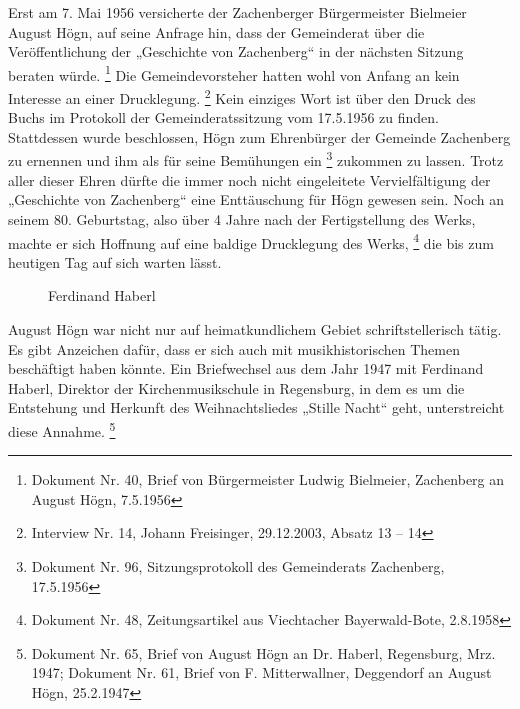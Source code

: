 Erst am 7. Mai 1956 versicherte der Zachenberger Bürgermeister Bielmeier
August Högn, auf seine Anfrage hin, dass der Gemeinderat über die
Veröffentlichung der „Geschichte von Zachenberg“ in der nächsten
Sitzung beraten würde. \footnote{Dokument Nr. 40, Brief von
Bürgermeister Ludwig Bielmeier, Zachenberg an August Högn, 7.5.1956}
Die Gemeindevorsteher hatten wohl von Anfang an kein Interesse an einer
Drucklegung. \footnote{Interview Nr. 14, Johann Freisinger, 29.12.2003,
Absatz 13 – 14} Kein einziges Wort ist über den Druck des Buchs im
Protokoll der Gemeinderatssitzung vom 17.5.1956 zu finden. Stattdessen
wurde beschlossen, Högn zum Ehrenbürger der Gemeinde Zachenberg zu
ernennen und ihm als für seine
Bemühungen ein  \footnote{Dokument Nr. 96,
Sitzungsprotokoll des Gemeinderats Zachenberg, 17.5.1956} zukommen zu
lassen. Trotz aller dieser Ehren dürfte die immer noch nicht
eingeleitete Vervielfältigung der „Geschichte von Zachenberg“ eine
Enttäuschung für Högn gewesen sein. Noch an seinem 80. Geburtstag, also
über 4 Jahre nach der Fertigstellung des Werks, machte er sich Hoffnung
auf eine baldige Drucklegung des Werks, \footnote{Dokument Nr. 48,
Zeitungsartikel aus Viechtacher Bayerwald-Bote, 2.8.1958} die bis zum
heutigen Tag auf sich warten lässt.

\begin{figure}
\caption{Ferdinand Haberl}
\end{figure}

August Högn war nicht nur auf heimatkundlichem Gebiet schriftstellerisch
tätig. Es gibt Anzeichen dafür, dass er sich auch mit musikhistorischen
Themen beschäftigt haben könnte. Ein Briefwechsel aus dem Jahr 1947 mit
Ferdinand Haberl, Direktor der Kirchenmusikschule in Regensburg, in dem
es um die Entstehung und Herkunft des Weihnachtsliedes „Stille Nacht“
geht, unterstreicht diese Annahme. \footnote{Dokument Nr. 65, Brief von
August Högn an Dr. Haberl, Regensburg, Mrz. 1947; Dokument Nr. 61,
Brief von F. Mitterwallner, Deggendorf an August Högn, 25.2.1947}
